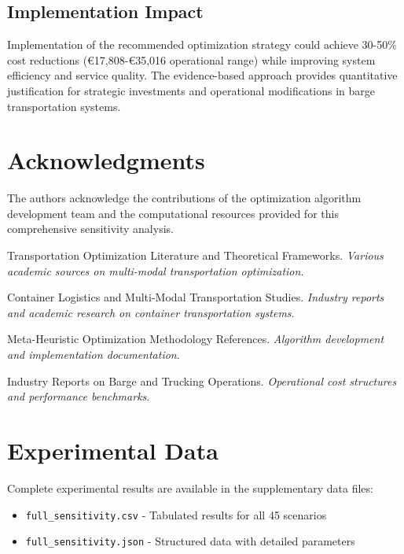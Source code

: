 \documentclass[12pt,a4paper]{article}
\begin{document}
\subsection{Implementation Impact}

Implementation of the recommended optimization strategy could achieve 30-50\% cost reductions (€17,808-€35,016 operational range) while improving system efficiency and service quality. The evidence-based approach provides quantitative justification for strategic investments and operational modifications in barge transportation systems.

\section*{Acknowledgments}

The authors acknowledge the contributions of the optimization algorithm development team and the computational resources provided for this comprehensive sensitivity analysis.


\begin{thebibliography}{9}

Transportation Optimization Literature and Theoretical Frameworks.
\textit{Various academic sources on multi-modal transportation optimization}.

Container Logistics and Multi-Modal Transportation Studies.
\textit{Industry reports and academic research on container transportation systems}.

Meta-Heuristic Optimization Methodology References.
\textit{Algorithm development and implementation documentation}.

Industry Reports on Barge and Trucking Operations.
\textit{Operational cost structures and performance benchmarks}.

\end{thebibliography}

\appendix

\section{Experimental Data}
\label{app:data}
Complete experimental results are available in the supplementary data files:
\begin{itemize}
    \item \texttt{full\_sensitivity.csv} - Tabulated results for all 45 scenarios
    \item \texttt{full\_sensitivity.json} - Structured data with detailed parameters
\end{itemize}
\end{document}
